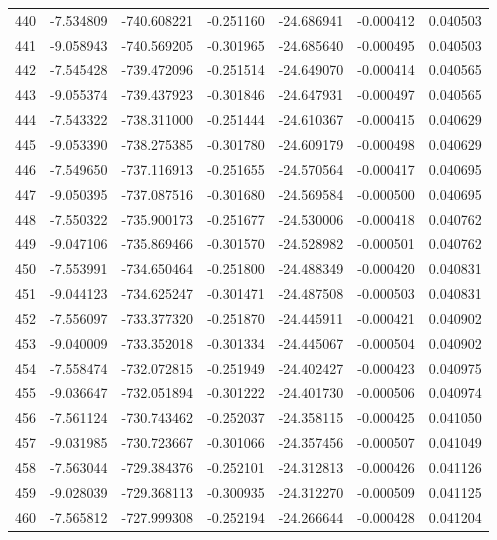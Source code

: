 \begin{tabular}{rrrrrrr}
 440 &  -7.534809 & -740.608221 & -0.251160 &  -24.686941 &   -0.000412 &  0.040503 \\
 441 &  -9.058943 & -740.569205 & -0.301965 &  -24.685640 &   -0.000495 &  0.040503 \\
 442 &  -7.545428 & -739.472096 & -0.251514 &  -24.649070 &   -0.000414 &  0.040565 \\
 443 &  -9.055374 & -739.437923 & -0.301846 &  -24.647931 &   -0.000497 &  0.040565 \\
 444 &  -7.543322 & -738.311000 & -0.251444 &  -24.610367 &   -0.000415 &  0.040629 \\
 445 &  -9.053390 & -738.275385 & -0.301780 &  -24.609179 &   -0.000498 &  0.040629 \\
 446 &  -7.549650 & -737.116913 & -0.251655 &  -24.570564 &   -0.000417 &  0.040695 \\
 447 &  -9.050395 & -737.087516 & -0.301680 &  -24.569584 &   -0.000500 &  0.040695 \\
 448 &  -7.550322 & -735.900173 & -0.251677 &  -24.530006 &   -0.000418 &  0.040762 \\
 449 &  -9.047106 & -735.869466 & -0.301570 &  -24.528982 &   -0.000501 &  0.040762 \\
 450 &  -7.553991 & -734.650464 & -0.251800 &  -24.488349 &   -0.000420 &  0.040831 \\
 451 &  -9.044123 & -734.625247 & -0.301471 &  -24.487508 &   -0.000503 &  0.040831 \\
 452 &  -7.556097 & -733.377320 & -0.251870 &  -24.445911 &   -0.000421 &  0.040902 \\
 453 &  -9.040009 & -733.352018 & -0.301334 &  -24.445067 &   -0.000504 &  0.040902 \\
 454 &  -7.558474 & -732.072815 & -0.251949 &  -24.402427 &   -0.000423 &  0.040975 \\
 455 &  -9.036647 & -732.051894 & -0.301222 &  -24.401730 &   -0.000506 &  0.040974 \\
 456 &  -7.561124 & -730.743462 & -0.252037 &  -24.358115 &   -0.000425 &  0.041050 \\
 457 &  -9.031985 & -730.723667 & -0.301066 &  -24.357456 &   -0.000507 &  0.041049 \\
 458 &  -7.563044 & -729.384376 & -0.252101 &  -24.312813 &   -0.000426 &  0.041126 \\
 459 &  -9.028039 & -729.368113 & -0.300935 &  -24.312270 &   -0.000509 &  0.041125 \\
 460 &  -7.565812 & -727.999308 & -0.252194 &  -24.266644 &   -0.000428 &  0.041204 \\

\end{tabular}

